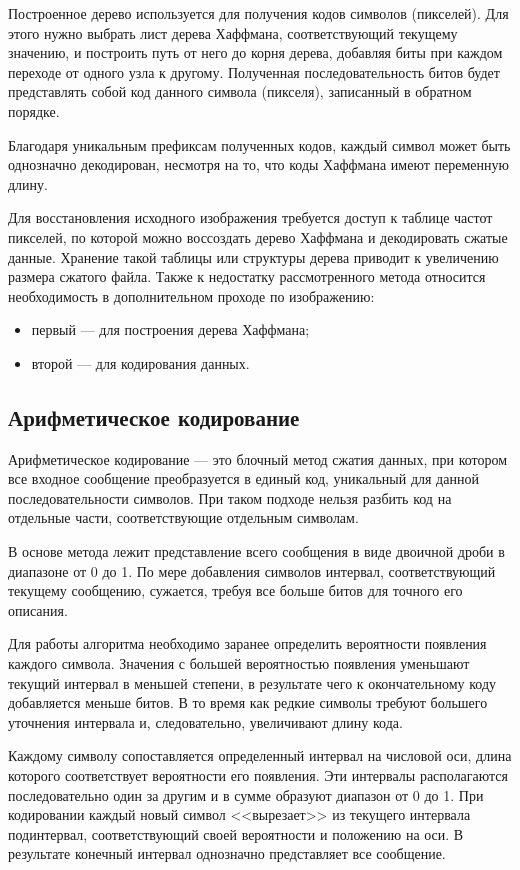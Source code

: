 Построенное дерево используется для получения кодов символов (пикселей). Для этого нужно выбрать лист дерева Хаффмана, соответствующий текущему значению, и построить путь от него до корня дерева, добавляя биты при каждом переходе от одного узла к другому. Полученная последовательность битов будет представлять собой код данного символа (пикселя), записанный в обратном порядке.

Благодаря уникальным префиксам полученных кодов, каждый символ может быть однозначно декодирован, несмотря на то, что коды Хаффмана имеют переменную длину.

Для восстановления исходного изображения требуется доступ к таблице частот пикселей, по которой можно воссоздать дерево Хаффмана и декодировать сжатые данные. Хранение такой таблицы или структуры дерева приводит к увеличению размера сжатого файла. Также к недостатку рассмотренного метода относится необходимость в дополнительном проходе по изображению:
\begin{itemize}
    \item первый --- для построения дерева Хаффмана;
    \item второй --- для кодирования данных.
\end{itemize}


\subsection{Арифметическое кодирование}

Арифметическое кодирование \cite{ArithmeticCoding} --- это блочный метод сжатия данных, при котором все входное сообщение преобразуется в единый код, уникальный для данной последовательности символов. При таком подходе нельзя разбить код на отдельные части, соответствующие отдельным символам.

В основе метода лежит представление всего сообщения в виде двоичной дроби в диапазоне от 0 до 1. По мере добавления символов интервал, соответствующий текущему сообщению, сужается, требуя все больше битов для точного его описания.

Для работы алгоритма необходимо заранее определить вероятности появления каждого символа. Значения с большей вероятностью появления уменьшают текущий интервал в меньшей степени, в результате чего к окончательному коду добавляется меньше битов. В то время как редкие символы требуют большего уточнения интервала и, следовательно, увеличивают длину кода.

Каждому символу сопоставляется определенный интервал на числовой оси, длина которого соответствует вероятности его появления. Эти интервалы располагаются последовательно один за другим и в сумме образуют диапазон от 0 до 1. При кодировании каждый новый символ <<вырезает>> из текущего интервала подинтервал, соответствующий своей вероятности и положению на оси. В результате конечный интервал однозначно представляет все сообщение.

